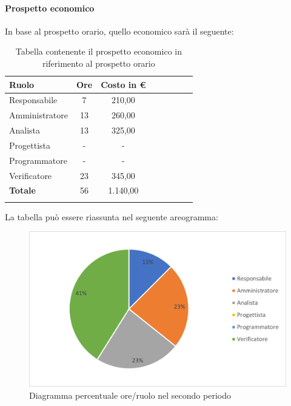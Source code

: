 			\paragraph{Prospetto economico}
			In base al prospetto orario, quello economico sarà il seguente: 
			
			\begin{longtable}{|l|c|c|c|c|c|c|c|}
				\hline
				\rowcolor{lighter-grayer}
				\textbf{Ruolo} & \textbf{Ore} & \textbf{Costo in €} \\
				\hline
				\endfirsthead
				
				\hline
				Responsabile & 7 & 210,00\\
				\hline
				\hline
				Amministratore & 13 & 260,00\\
				\hline
				\hline
				Analista & 13 & 325,00\\
				\hline
				\hline
				Progettista & - & -\\
				\hline
				\hline
				Programmatore & - & -\\
				\hline
				\hline
				Verificatore & 23 & 345,00\\
				\hline
				\hline
				\textbf{Totale} & 56 & 1.140,00\\
				\hline
				\rowcolor{white}
				\caption{Tabella contenente il prospetto economico in riferimento al prospetto orario}
			\end{longtable}
			\pagebreak
		
			La tabella può essere riassunta nel seguente areogramma:
			\begin{figure}[H]
				\centering
				\includegraphics[width=0.8\linewidth]{res/images/preventivo/dettaglio_analisi/2-2.png}
				\caption{Diagramma percentuale ore/ruolo nel secondo periodo}
				\label{fig:diagramma costi ruolo secondo periodo analisi}
            \end{figure}

